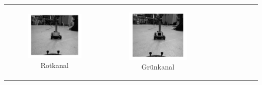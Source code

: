 \begin{center}
\begin{table}[ht]
\begin{tabular}{c c c}
\begin{subfigure}{0.3\textwidth}\centering

\includegraphics[scale=0.08]{Figures/rotkanal.png} \vspace{-3.5mm}\caption{Rotkanal}
\end{subfigure}&
\begin{subfigure}{0.3\textwidth}\centering

\includegraphics[scale=0.08]{Figures/gruenkanal.png} \vspace{-3.5mm}\caption{Grünkanal}
\end{subfigure}&\begin{subfigure}{0.3\textwidth}\centering


\end{subfigure}
\end{tabular}
\end{table}
\end{center}
